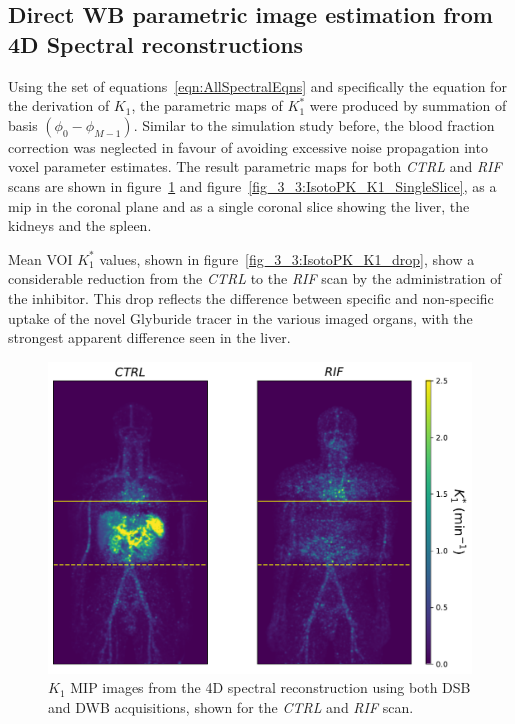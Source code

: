 \subsection{Direct WB parametric image estimation from 4D Spectral reconstructions}
Using the set of equations~\ref{eqn:AllSpectralEqns} and specifically the equation for the derivation of $K_1$, the parametric maps of $K_1^{*}$ were produced by summation of basis $(\phi_0-\phi_{M-1})$. Similar to the simulation study before, the blood fraction correction was neglected in favour of avoiding excessive noise propagation into voxel parameter estimates. The result parametric maps for both \textit{CTRL} and \textit{RIF} scans are shown in figure~\ref{fig_3_3:IsotoPK_K1_MIP} and figure~\ref{fig_3_3:IsotoPK_K1_SingleSlice}, as a \gls{mip} in the coronal plane and as a single coronal slice showing the liver, the kidneys and the spleen.

Mean VOI $K_1^{*}$ values, shown in figure~\ref{fig_3_3:IsotoPK_K1_drop}, show a considerable reduction from the \textit{CTRL} to the \textit{RIF} scan by the administration of the inhibitor. This drop reflects the difference between specific and non-specific uptake of the novel Glyburide tracer in the various imaged organs, with the strongest apparent difference seen in the liver.

\begin{figure} [ht!]
\centering
\includegraphics[scale=0.5,angle=0]{3_Results/3_3_DWB_Reconstruction/figures/3_3_IsotoPK_K1_MIPs.pdf}
\caption{$K_1$ MIP images from the 4D spectral reconstruction using both DSB and DWB acquisitions, shown for the \textit{CTRL} and \textit{RIF} scan.}
\label{fig_3_3:IsotoPK_K1_MIP}
\end{figure} 

